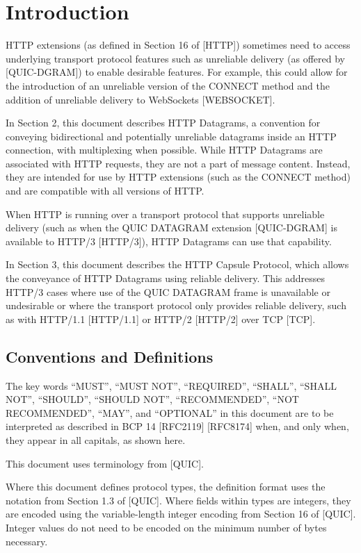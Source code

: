 \documentclass{article}
\begin{document}
\tableofcontents

\section{Introduction}

HTTP extensions (as defined in Section 16 of [HTTP]) sometimes need
to access underlying transport protocol features such as unreliable
delivery (as offered by [QUIC-DGRAM]) to enable desirable features.
For example, this could allow for the introduction of an unreliable
version of the CONNECT method and the addition of unreliable delivery
to WebSockets [WEBSOCKET].

In Section 2, this document describes HTTP Datagrams, a convention
for conveying bidirectional and potentially unreliable datagrams
inside an HTTP connection, with multiplexing when possible.  While
HTTP Datagrams are associated with HTTP requests, they are not a part
of message content.  Instead, they are intended for use by HTTP
extensions (such as the CONNECT method) and are compatible with all
versions of HTTP.

When HTTP is running over a transport protocol that supports
unreliable delivery (such as when the QUIC DATAGRAM extension
[QUIC-DGRAM] is available to HTTP/3 [HTTP/3]), HTTP Datagrams can use
that capability.

In Section 3, this document describes the HTTP Capsule Protocol,
which allows the conveyance of HTTP Datagrams using reliable
delivery.  This addresses HTTP/3 cases where use of the QUIC DATAGRAM
frame is unavailable or undesirable or where the transport protocol
only provides reliable delivery, such as with HTTP/1.1 [HTTP/1.1] or
HTTP/2 [HTTP/2] over TCP [TCP].

\subsection{Conventions and Definitions}

The key words ``MUST'', ``MUST NOT'', ``REQUIRED'', ``SHALL'', ``SHALL NOT'',
``SHOULD'', ``SHOULD NOT'', ``RECOMMENDED'', ``NOT RECOMMENDED'', ``MAY'', and
``OPTIONAL'' in this document are to be interpreted as described in
BCP 14 [RFC2119] [RFC8174] when, and only when, they appear in all
capitals, as shown here.

This document uses terminology from [QUIC].

Where this document defines protocol types, the definition format
uses the notation from Section 1.3 of [QUIC].  Where fields within
types are integers, they are encoded using the variable-length
integer encoding from Section 16 of [QUIC].  Integer values do not
need to be encoded on the minimum number of bytes necessary.
\end{document}
